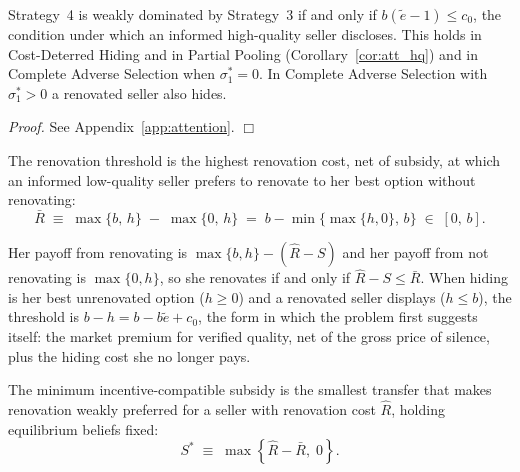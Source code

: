 \documentclass[10pt,letterpaper]{bp-template-concise}
\begin{document}
\begin{lemma}
\label{lem:renov_behaviour}
Strategy~4 is weakly dominated by Strategy~3 if and only if $b(\tilde e-1)\le c_0$, the condition under which an informed high-quality seller discloses. This holds in Cost-Deterred Hiding and in Partial Pooling (Corollary~\ref{cor:att_hq}) and in Complete Adverse Selection when $\sigma_1^*=0$. In Complete Adverse Selection with $\sigma_1^*>0$ a renovated seller also hides.
\end{lemma}

\noindent\textit{Proof.} See Appendix~\ref{app:attention}. $\Box$

\begin{definition}
\label{def:threshold}
The renovation threshold is the highest renovation cost, net of subsidy, at which an informed low-quality seller prefers to renovate to her best option without renovating:
\begin{equation}
    \bar{R}\;\equiv\;\max\{b,\,h\}\;-\;\max\{0,\,h\}\;=\;b-\min\big\{\max\{h,0\},\,b\big\}\;\in\;[0,\,b].
    \label{eq:threshold}
\end{equation}
\end{definition}

\noindent Her payoff from renovating is $\max\{b,h\}-(\hat R-S)$ and her payoff from not renovating is $\max\{0,h\}$, so she renovates if and only if $\hat R-S\le\bar R$. When hiding is her best unrenovated option ($h\ge0$) and a renovated seller displays ($h\le b$), the threshold is $b-h=b-b\tilde e+c_0$, the form in which the problem first suggests itself: the market premium for verified quality, net of the gross price of silence, plus the hiding cost she no longer pays.

\begin{definition}
\label{def:minimum_subsidy}
The minimum incentive-compatible subsidy is the smallest transfer that makes renovation weakly preferred for a seller with renovation cost $\hat R$, holding equilibrium beliefs fixed:
\begin{equation}
    S^*\;\equiv\;\max\!\left\{\hat{R}-\bar{R},\;0\right\}.
    \label{eq:subsidy}
\end{equation}
\end{definition}
\end{document}
